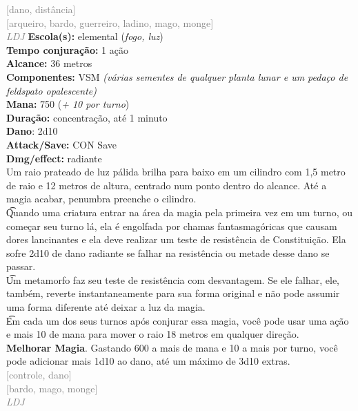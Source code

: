 \documentclass{RPG_Adventure}[2021/10/20]
\begin{document}
{\scriptsize \textcolor{gray}{[dano, distância]\\}}
{\scriptsize \textcolor{gray}{[arqueiro, bardo, guerreiro, ladino, mago, monge]\\}}
{\tiny \textcolor{gray}{\textit{LDJ}}}
{\small \t \textbf{Escola(s):} elemental (\textit{fogo, luz})\\\t \textbf{Tempo conjuração:} 1 ação\\\t \textbf{Alcance:} 36 metros\\\t \textbf{Componentes:} VSM \textit{(várias sementes de qualquer planta lunar e um pedaço de feldspato opalescente)}\\\t \textbf{Mana:} 750 (\textit{+ 10 por turno})\\\t \textbf{Duração:} concentração, até 1 minuto\\\t \textbf{Dano}: 2d10\\\t \textbf{Attack/Save:} CON Save\\\t \textbf{Dmg/effect:} radiante\\}
{\normalsize Um raio prateado de luz pálida brilha para baixo em um cilindro com 1,5 metro de raio e 12 metros de altura, centrado num ponto dentro do alcance. Até a magia acabar, penumbra preenche o cilindro.\\\t Quando uma criatura entrar na área da magia pela primeira vez em um turno, ou começar seu turno lá, ela é engolfada por chamas fantasmagóricas que causam dores lancinantes e ela deve realizar um teste de resistência de Constituição. Ela sofre 2d10 de dano radiante se falhar na resistência ou metade desse dano se passar.\\\t Um metamorfo faz seu teste de resistência com desvantagem. Se ele falhar, ele, também, reverte instantaneamente para sua forma original e não pode assumir uma forma diferente até deixar a luz da magia.\\\t Em cada um dos seus turnos após conjurar essa magia, você pode usar uma ação e mais 10 de mana para mover o raio 18 metros em qualquer direção.\\\t \textbf{Melhorar Magia}. Gastando 600 a mais de mana e 10 a mais por turno, você pode adicionar mais 1d10 ao dano, até um máximo de 3d10 extras.\\}
{\scriptsize \textcolor{gray}{[controle, dano]\\}}
{\scriptsize \textcolor{gray}{[bardo, mago, monge]\\}}
{\tiny \textcolor{gray}{\textit{LDJ}}}
\end{document}
